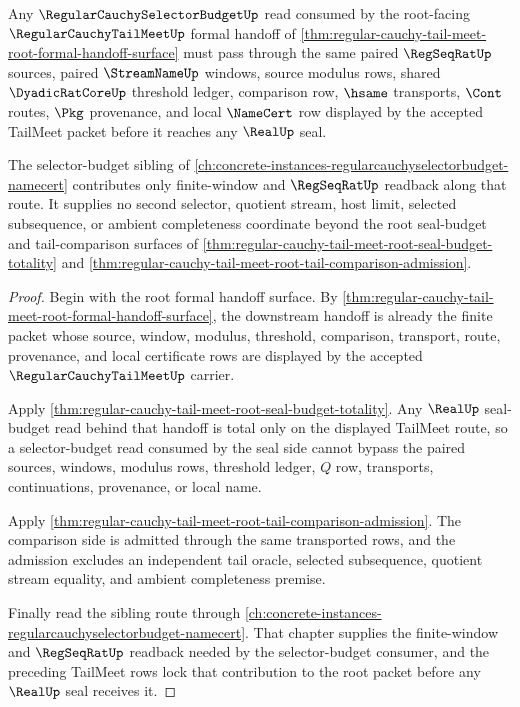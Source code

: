 \begin{theorem}
\label{thm:regular-cauchy-tail-meet-selector-budget-route-lock}
Any $\RegularCauchySelectorBudgetUp$ read consumed by the root-facing $\RegularCauchyTailMeetUp$ formal handoff of \autoref{thm:regular-cauchy-tail-meet-root-formal-handoff-surface} must pass through the same paired $\RegSeqRatUp$ sources, paired $\StreamNameUp$ windows, source modulus rows, shared $\DyadicRatCoreUp$ threshold ledger, comparison row, $\hsame$ transports, $\Cont$ routes, $\Pkg$ provenance, and local $\NameCert$ row displayed by the accepted TailMeet packet before it reaches any $\RealUp$ seal.

The selector-budget sibling of \autoref{ch:concrete-instances-regularcauchyselectorbudget-namecert} contributes only finite-window and $\RegSeqRatUp$ readback along that route. It supplies no second selector, quotient stream, host limit, selected subsequence, or ambient completeness coordinate beyond the root seal-budget and tail-comparison surfaces of \autoref{thm:regular-cauchy-tail-meet-root-seal-budget-totality} and \autoref{thm:regular-cauchy-tail-meet-root-tail-comparison-admission}.
\end{theorem}
\begin{proof}
Begin with the root formal handoff surface. By \autoref{thm:regular-cauchy-tail-meet-root-formal-handoff-surface}, the downstream handoff is already the finite packet whose source, window, modulus, threshold, comparison, transport, route, provenance, and local certificate rows are displayed by the accepted $\RegularCauchyTailMeetUp$ carrier.

Apply \autoref{thm:regular-cauchy-tail-meet-root-seal-budget-totality}. Any $\RealUp$ seal-budget read behind that handoff is total only on the displayed TailMeet route, so a selector-budget read consumed by the seal side cannot bypass the paired sources, windows, modulus rows, threshold ledger, $Q$ row, transports, continuations, provenance, or local name.

Apply \autoref{thm:regular-cauchy-tail-meet-root-tail-comparison-admission}. The comparison side is admitted through the same transported rows, and the admission excludes an independent tail oracle, selected subsequence, quotient stream equality, and ambient completeness premise.

Finally read the sibling route through \autoref{ch:concrete-instances-regularcauchyselectorbudget-namecert}. That chapter supplies the finite-window and $\RegSeqRatUp$ readback needed by the selector-budget consumer, and the preceding TailMeet rows lock that contribution to the root packet before any $\RealUp$ seal receives it.
\end{proof}


